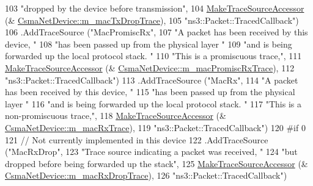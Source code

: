 \begin{DoxyCode}
103                      \textcolor{stringliteral}{"dropped by the device before transmission"},
104                      \hyperlink{group__tracing_gab21a770b9855af4e8f69f7531ea4a6b0}{MakeTraceSourceAccessor} (&
      \hyperlink{classns3_1_1CsmaNetDevice_ac6e2a81eedea1fa443600bbac37842b2}{CsmaNetDevice::m\_macTxDropTrace}),
105                      \textcolor{stringliteral}{"ns3::Packet::TracedCallback"})
106     .AddTraceSource (\textcolor{stringliteral}{"MacPromiscRx"}, 
107                      \textcolor{stringliteral}{"A packet has been received by this device, "}
108                      \textcolor{stringliteral}{"has been passed up from the physical layer "}
109                      \textcolor{stringliteral}{"and is being forwarded up the local protocol stack.  "}
110                      \textcolor{stringliteral}{"This is a promiscuous trace,"},
111                      \hyperlink{group__tracing_gab21a770b9855af4e8f69f7531ea4a6b0}{MakeTraceSourceAccessor} (&
      \hyperlink{classns3_1_1CsmaNetDevice_a4b22f431d8511abaf9ef4e92cc41ce24}{CsmaNetDevice::m\_macPromiscRxTrace}),
112                      \textcolor{stringliteral}{"ns3::Packet::TracedCallback"})
113     .AddTraceSource (\textcolor{stringliteral}{"MacRx"}, 
114                      \textcolor{stringliteral}{"A packet has been received by this device, "}
115                      \textcolor{stringliteral}{"has been passed up from the physical layer "}
116                      \textcolor{stringliteral}{"and is being forwarded up the local protocol stack.  "}
117                      \textcolor{stringliteral}{"This is a non-promiscuous trace,"},
118                      \hyperlink{group__tracing_gab21a770b9855af4e8f69f7531ea4a6b0}{MakeTraceSourceAccessor} (&
      \hyperlink{classns3_1_1CsmaNetDevice_a40f2a9fcb15d1e44fc918d1639bff18a}{CsmaNetDevice::m\_macRxTrace}),
119                      \textcolor{stringliteral}{"ns3::Packet::TracedCallback"})
120 \textcolor{preprocessor}{#if 0}
121     \textcolor{comment}{// Not currently implemented in this device}
122     .AddTraceSource (\textcolor{stringliteral}{"MacRxDrop"}, 
123                      \textcolor{stringliteral}{"Trace source indicating a packet was received, "}
124                      \textcolor{stringliteral}{"but dropped before being forwarded up the stack"},
125                      \hyperlink{group__tracing_gab21a770b9855af4e8f69f7531ea4a6b0}{MakeTraceSourceAccessor} (&
      \hyperlink{classns3_1_1CsmaNetDevice_a0ba6e9b6d9403e55044c695ece47e311}{CsmaNetDevice::m\_macRxDropTrace}),
126                      \textcolor{stringliteral}{"ns3::Packet::TracedCallback"})

\end{DoxyCode}
